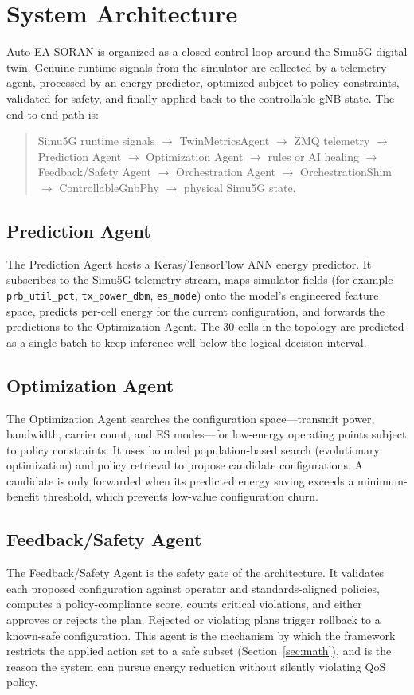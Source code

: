 \documentclass[conference]{IEEEtran}
\begin{document}
\section{System Architecture}
Auto EA-SORAN is organized as a closed control loop around the Simu5G digital twin. Genuine runtime signals from the simulator are collected by a telemetry agent, processed by an energy predictor, optimized subject to policy constraints, validated for safety, and finally applied back to the controllable gNB state. The end-to-end path is:
\begin{quote}\small
Simu5G runtime signals $\rightarrow$ TwinMetricsAgent $\rightarrow$ ZMQ telemetry $\rightarrow$ Prediction Agent $\rightarrow$ Optimization Agent $\rightarrow$ rules or AI healing $\rightarrow$ Feedback/Safety Agent $\rightarrow$ Orchestration Agent $\rightarrow$ OrchestrationShim $\rightarrow$ ControllableGnbPhy $\rightarrow$ physical Simu5G state.
\end{quote}

\subsection{Prediction Agent}
The Prediction Agent hosts a Keras/TensorFlow ANN energy predictor. It subscribes to the Simu5G telemetry stream, maps simulator fields (for example \texttt{prb\_util\_pct}, \texttt{tx\_power\_dbm}, \texttt{es\_mode}) onto the model's engineered feature space, predicts per-cell energy for the current configuration, and forwards the predictions to the Optimization Agent. The 30 cells in the topology are predicted as a single batch to keep inference well below the logical decision interval.

\subsection{Optimization Agent}
The Optimization Agent searches the configuration space---transmit power, bandwidth, carrier count, and ES modes---for low-energy operating points subject to policy constraints. It uses bounded population-based search (evolutionary optimization) and policy retrieval to propose candidate configurations. A candidate is only forwarded when its predicted energy saving exceeds a minimum-benefit threshold, which prevents low-value configuration churn.

\subsection{Feedback/Safety Agent}
The Feedback/Safety Agent is the safety gate of the architecture. It validates each proposed configuration against operator and standards-aligned policies, computes a policy-compliance score, counts critical violations, and either approves or rejects the plan. Rejected or violating plans trigger rollback to a known-safe configuration. This agent is the mechanism by which the framework restricts the applied action set to a safe subset (Section~\ref{sec:math}), and is the reason the system can pursue energy reduction without silently violating QoS policy.
\end{document}
